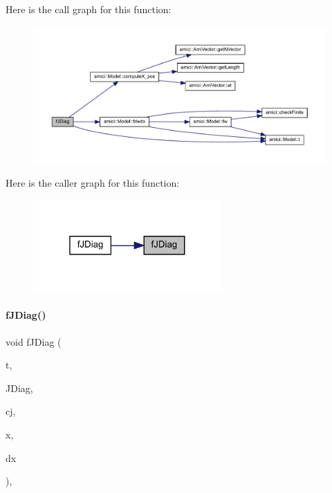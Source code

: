 Here is the call graph for this function\+:
\nopagebreak
\begin{figure}[H]
\begin{center}
\leavevmode
\includegraphics[width=350pt]{classamici_1_1_model___o_d_e_a894cb7158f20a976348caa9d73520d40_cgraph}
\end{center}
\end{figure}
Here is the caller graph for this function\+:
\nopagebreak
\begin{figure}[H]
\begin{center}
\leavevmode
\includegraphics[width=205pt]{classamici_1_1_model___o_d_e_a894cb7158f20a976348caa9d73520d40_icgraph}
\end{center}
\end{figure}
\mbox{\label{classamici_1_1_model___o_d_e_a79269ef1a74e1ad9e313dce0e4220291}} 
\paragraph{\texorpdfstring{fJDiag()}{fJDiag()}\hspace{0.1cm}{\footnotesize\ttfamily [2/3]}}
{\footnotesize\ttfamily void f\+J\+Diag (\begin{DoxyParamCaption}\item[{\mbox{\hyperlink{namespaceamici_a1bdce28051d6a53868f7ccbf5f2c14a3}{realtype}}}]{t,  }\item[{\mbox{\hyperlink{classamici_1_1_ami_vector}{Ami\+Vector}} $\ast$}]{J\+Diag,  }\item[{\mbox{\hyperlink{namespaceamici_a1bdce28051d6a53868f7ccbf5f2c14a3}{realtype}}}]{cj,  }\item[{\mbox{\hyperlink{classamici_1_1_ami_vector}{Ami\+Vector}} $\ast$}]{x,  }\item[{\mbox{\hyperlink{classamici_1_1_ami_vector}{Ami\+Vector}} $\ast$}]{dx }\end{DoxyParamCaption})\hspace{0.3cm}{\ttfamily [override]}, {\ttfamily [virtual]}}

